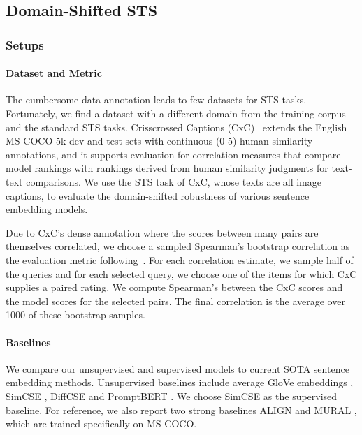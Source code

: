 \documentclass[11pt]{article}
\begin{document}
\subsection{Domain-Shifted STS}
\label{sec: transfer sts}
\subsubsection{Setups}
\paragraph{Dataset and Metric}
The cumbersome data annotation leads to few datasets for STS tasks. Fortunately, we find a dataset with a different domain from the training corpus and the standard STS tasks. 
Crisscrossed Captions (CxC)~\cite{parekh-etal-2021-cococxc} extends the English MS-COCO \cite{mscoco} 5k dev and test sets with continuous (0-5) human similarity annotations, and it supports evaluation for correlation measures that compare model rankings with rankings derived from human similarity judgments for text-text comparisons.
We use the STS task of CxC, whose texts are all image captions, to evaluate the domain-shifted robustness of various sentence embedding models.

Due to CxC’s dense annotation where the scores between many pairs are themselves correlated, we choose a sampled Spearman's bootstrap correlation as the evaluation metric following~\cite{parekh-etal-2021-cococxc}. For each correlation estimate, we sample half of the queries and for each selected query, we choose one of the items for which CxC supplies a paired rating. We compute Spearman’s  between the CxC scores and the model scores for the selected pairs. The final correlation is the average over 1000 of these bootstrap samples.

\paragraph{Baselines}
We compare our unsupervised and supervised models to current SOTA sentence embedding methods. Unsupervised baselines include average GloVe embeddings \cite{glove}, SimCSE \cite{gao2021simcse}, DiffCSE \cite{chuang2022diffcse} and PromptBERT \cite{2022promptbert}. We choose SimCSE \cite{gao2021simcse} as the supervised baseline.
For reference, we also report two strong baselines ALIGN \cite{jia2021align} and MURAL \cite{jain-etal-2021-mural-multimodal}, which are trained specifically on MS-COCO.
\end{document}
